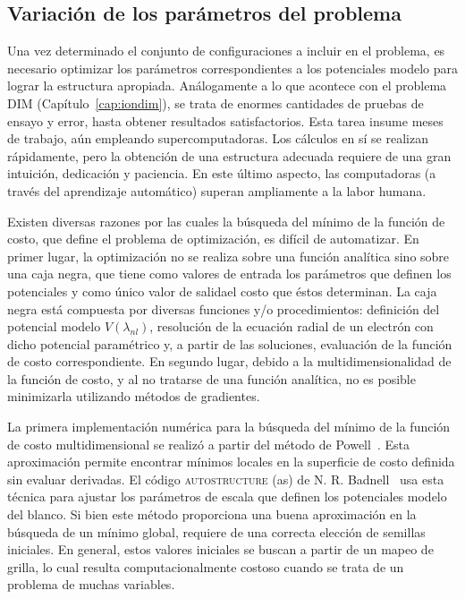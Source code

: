 \subsection{Variación de los parámetros del problema}
\label{sec:powell}

Una vez determinado el conjunto de configuraciones a incluir en el 
problema, es necesario optimizar los parámetros correspondientes a los 
potenciales modelo para lograr la estructura apropiada. Análogamente a 
lo que acontece con el problema DIM (Capítulo~\ref{cap:iondim}), se 
trata de enormes cantidades de pruebas de ensayo y error, hasta obtener 
resultados satisfactorios. Esta tarea insume meses de trabajo, aún 
empleando supercomputadoras. Los cálculos en sí se realizan rápidamente, 
pero la obtención de una estructura adecuada requiere de una gran 
intuición, dedicación y paciencia. En este último aspecto, las 
computadoras (a través del aprendizaje automático) superan ampliamente a 
la labor humana.

Existen diversas razones por las cuales la búsqueda del mínimo de la 
función de costo, que define el problema de optimización, es difícil de 
automatizar. En primer lugar, la optimización no se realiza sobre una 
función analítica sino sobre una caja negra, que tiene como valores de 
entrada los parámetros que definen los potenciales y como único valor de 
salidael costo que éstos determinan. La caja negra está compuesta por 
diversas funciones y/o procedimientos: definición del potencial modelo 
$V(\lambda_{nl})$, resolución de la ecuación radial de un electrón con 
dicho potencial paramétrico y, a partir de las soluciones, evaluación de 
la función de costo correspondiente. En segundo lugar, debido a la 
multidimensionalidad de la función de costo, y al no tratarse de una 
función analítica, no es posible minimizarla utilizando métodos de 
gradientes. 

La primera implementación numérica para la búsqueda del mínimo de la 
función de costo multidimensional se realizó a partir del método de 
Powell~\cite{Powell:64,NumRec:07}. Esta aproximación permite encontrar 
mínimos locales en la superficie de costo definida sin evaluar 
derivadas. El código \textsc{autostructure} (\acs{as}) de N. R. 
Badnell~\cite{Badnell:11} usa esta técnica para ajustar los parámetros 
de escala que definen los potenciales modelo del blanco. Si bien este 
método proporciona una buena aproximación en la búsqueda de un mínimo 
global, requiere de una correcta elección de semillas iniciales. En 
general, estos valores iniciales se buscan a partir de un mapeo de 
grilla, lo cual resulta computacionalmente costoso cuando se trata de un 
problema de muchas variables.


